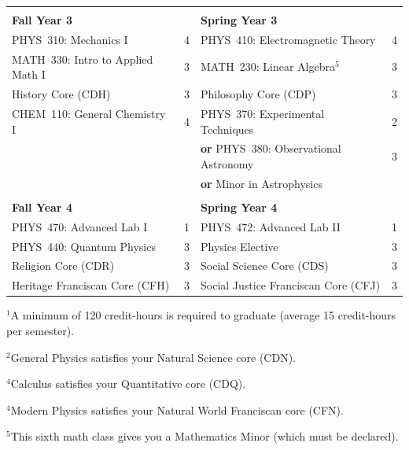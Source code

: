 \documentclass[12pt]{article}
\begin{document}
\begin{table}[h!]
\begin{center}
{\begin{tabular*}{0.9\textwidth}{@{\extracolsep{\fill}}lclc}
 & \\
{\Large \textbf{Fall Year 3}} & & {\Large \textbf{Spring Year 3}} & \\
\hline
PHYS~310: Mechanics I             & 4 & PHYS~410: Electromagnetic Theory  & 4 \\
MATH~330: Intro to Applied Math I & 3 & MATH~230: Linear Algebra$^{5}$    & 3 \\
History Core (CDH)                & 3 & Philosophy Core (CDP)             & 3 \\
CHEM~110: General Chemistry I     & 4 & PHYS~370: Experimental Techniques & 2 \\
                                  &   & \hspace{0.5mm} \textbf{or} PHYS~380: Observational Astronomy & 3 \\
                                  &   & \hspace{0.5mm} \textbf{or} Minor in Astrophysics     &  \\

 & \\
{\Large \textbf{Fall Year 4}} & & {\Large \textbf{Spring Year 4}} & \\
\hline
PHYS~470: Advanced Lab I       & 1 & PHYS~472: Advanced Lab II  & 1 \\
PHYS~440: Quantum Physics      & 3 & Physics Elective           & 3 \\
Religion Core (CDR)            & 3 & Social Science Core (CDS) & 3 \\
Heritage Franciscan Core (CFH) & 3 & Social Justice Franciscan Core (CFJ) & 3 \\
\hline
\end{tabular*}
}
\end{center}
\end{table}

\vspace*{-4mm}
\hspace{0.1in}$^{1}$A minimum of 120 credit-hours is required to
graduate (average 15 credit-hours per semester).

\hspace{0.1in}$^{2}$General Physics satisfies your Natural Science core (CDN).

\hspace{0.1in}$^{4}$Calculus satisfies your Quantitative core (CDQ).

\hspace{0.1in}$^{4}$Modern Physics satisfies your Natural World Franciscan core
(CFN). 

\hspace{0.1in}$^{5}$This sixth math class gives you a Mathematics Minor (which
must be declared).
\end{document}
